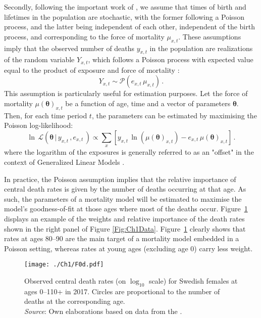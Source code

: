 \documentclass[Thesis]{subfiles}
\begin{document}
Secondly, following the important work of \cite{brillinger1986biometrics}, we assume that times of birth and lifetimes in the population are stochastic, with the former following a Poisson process, and the latter being independent of each other, independent of the birth process, and corresponding to the force of mortality $\mu_{x,t}$. These assumptions imply that  the observed number of deaths $y_{x,t}$ in the population are  realizations of the random variable $Y_{x,t}$, which follows a Poisson process with expected value equal to the product of exposure and force of mortality \cite[see][p.~700]{brillinger1986biometrics}:
%
\begin{equation}\label{Eq:Ch1Poisson}
Y_{x,t} \sim \mathcal{P}(e_{x,t} \, \mu_{x,t})  \, .
\end{equation}
%
This assumption is particularly useful for estimation purposes. Let the force of mortality $\mu(\bm{\theta})_{x,t}$ be a function of age, time and a vector of parameters $\bm{\theta}$. Then, for each time period $t$, the parameters can be estimated by maximising the Poisson log-likelihood:
% 
\begin{equation}\label{Eq:Ch1PoiLogLike}
\ln \, \mathcal{L}\left(\bm{\theta}\,|\, y_{x,t}\,,e_{x,t}\, \right) \propto \sum_{x} \left[  y_{x,t} \,
\ln \left(\mu(\bm{\theta})_{x,t}\right) - e_{x,t}
\, \mu(\bm{\theta})_{x,t}  \right]  \, .
\end{equation}
% 
where the logarithm of the exposures is generally referred to as an "offset" in the context of Generalized Linear Models \cite[GLMs,][]{mccullagh1989glm}. 

In practice, the Poisson assumption implies that the relative importance of central death rates is given by the number of deaths occurring at that age. As such, the  parameters of a mortality model will be estimated to maximise the model's goodness-of-fit at those ages where most of the deaths occur. Figure~\ref{Fig:Ch1RatesWeights} displays an example of the weights and relative importance of the death rates shown in the right panel of Figure \ref{Fig:Ch1Data}. Figure~\ref{Fig:Ch1RatesWeights} clearly shows that rates at ages 80--90 are the main target of a mortality model embedded in a Poisson setting, whereas rates at young ages (excluding age 0) carry less weight.   

\begin{figure}[!ht]
	\begin{center}
		\texttt{[image: ./Ch1/F0d.pdf]}
		\caption{Observed central death rates (on $\log_{10}$ scale) for Swedish females at ages 0--110+ in 2017. Circles are proportional to the number of deaths at the corresponding age. \\
		\textit{Source}: Own elaborations based on data from the \cite{HMD}.}\label{Fig:Ch1RatesWeights}
	\end{center}
\end{figure} 
 
\end{document}
